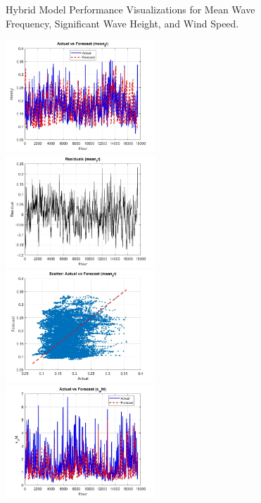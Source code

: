 \begin{figure}
    \caption{Hybrid Model Performance Visualizations for Mean Wave Frequency, Significant Wave Height, and Wind Speed.}
    \label{fig:hybrid_all}
\end{figure}

\begin{figure}[ht!]
    \centering
    \includegraphics[width=0.5\textwidth]{"graphs/bnn with mcd/mean_fr/actual vs forecast.jpg"}\hfill
    \includegraphics[width=0.5\textwidth]{"graphs/bnn with mcd/mean_fr/residuals.jpg"}\\[1ex]
    \includegraphics[width=0.5\textwidth]{"graphs/bnn with mcd/mean_fr/scatter plot.jpg"}\hfill
    \includegraphics[width=0.5\textwidth]{"graphs/bnn with mcd/s_wht/actual vs forecast.jpg"}\\[1ex]

\end{figure}
